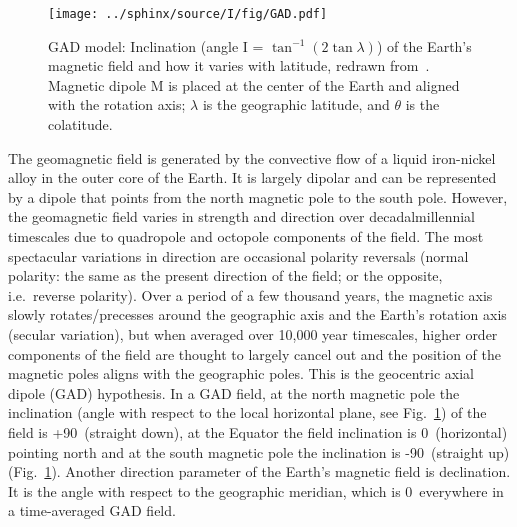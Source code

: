 \begin{figure}
  \centering
    \texttt{[image: ../sphinx/source/I/fig/GAD.pdf]}
  \captionsetup{width=.95\textwidth}
  \caption[Geocentric axial dipole (GAD) model]{GAD model: Inclination (angle I
  = $\tan^{-1}(2\tan\lambda)$) of the Earth's magnetic field and how it varies
  with latitude, redrawn from~\citet{B92,T19,T08}. Magnetic dipole M is placed
  at the center of the Earth and aligned with the rotation axis; $\lambda$ is
  the geographic latitude, and $\theta$ is the
  colatitude.}\label{Fig:chap_intro_gad}
\end{figure}

The geomagnetic field is generated by the convective flow of a liquid
iron-nickel alloy in the outer core of the Earth. It is largely dipolar and can
be represented by a dipole that points from the north magnetic pole to the south
pole. However, the geomagnetic field varies in strength and direction over
decadal\textendash{}millennial timescales due to quadropole and octopole
components of the field. The most spectacular variations in direction are
occasional polarity reversals (normal polarity: the same as the present
direction of the field; or the opposite, i.e.\ reverse polarity). Over a period
of a few thousand years, the magnetic axis slowly rotates/precesses around the
geographic axis and the Earth's rotation axis (secular variation), but when
averaged over 10,000 year timescales, higher order components of the field are
thought to largely cancel out and the position of the magnetic poles aligns with
the geographic poles. This is the geocentric axial dipole (GAD) hypothesis. In a
GAD field, at the north magnetic pole the inclination (angle with respect to the
local horizontal plane, see Fig.~\ref{Fig:chap_intro_gad}) of the field is
+90\degree\ (straight down), at the Equator the field inclination is 0\degree\
(horizontal) pointing north and at the south magnetic pole the inclination is
-90\degree\ (straight up) (Fig.~\ref{Fig:chap_intro_gad}). Another direction
parameter of the Earth's magnetic field is declination. It is the angle with
respect to the geographic meridian, which is 0\degree\ everywhere in a
time-averaged GAD field.


